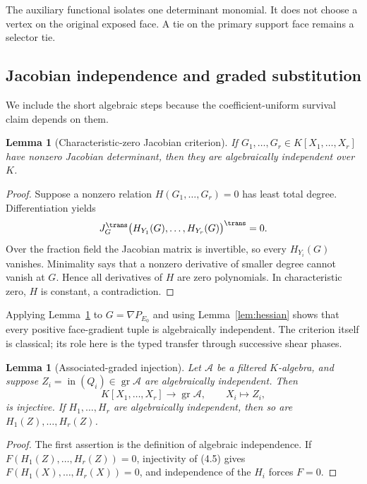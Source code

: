 \documentclass[11pt]{article}
\newtheorem{lemma}[theorem]{Lemma}
\theoremstyle{definition}
\theoremstyle{remark}
\begin{document}
The auxiliary functional isolates one determinant monomial.  It does not
choose a vertex on the original exposed face.  A tie on the primary
support face remains a selector tie.

\subsection{Jacobian independence and graded substitution}

We include the short algebraic steps because the coefficient-uniform
survival claim depends on them.

\begin{lemma}[Characteristic-zero Jacobian criterion]
\label{lem:jacobian}
If \(G_1,\ldots,G_r\in K[X_1,\ldots,X_r]\) have nonzero Jacobian
determinant, then they are algebraically independent over \(K\).
\end{lemma}

\begin{proof}
Suppose a nonzero relation \(H(G_1,\ldots,G_r)=0\) has least total degree.
Differentiation yields
\[
 J_G^{\trans}
 \bigl(H_{Y_1}(G),\ldots,H_{Y_r}(G)\bigr)^{\trans}=0.
\]
Over the fraction field the Jacobian matrix is invertible, so every
\(H_{Y_i}(G)\) vanishes.  Minimality says that a nonzero derivative of
smaller degree cannot vanish at \(G\).  Hence all derivatives of \(H\) are
zero polynomials.  In characteristic zero, \(H\) is constant, a
contradiction.
\end{proof}

Applying Lemma~\ref{lem:jacobian} to
\(G=\nabla P_{E_0}\) and using Lemma~\ref{lem:hessian} shows that every
positive face-gradient tuple is algebraically independent.  The criterion
itself is classical; its role here is the typed transfer through successive
shear phases.

\begin{lemma}[Associated-graded injection]
\label{lem:graded}
Let \(\mathcal A\) be a filtered \(K\)-algebra, and suppose
\(Z_i=\operatorname{in}(Q_i)\in\operatorname{gr}\mathcal A\) are
algebraically independent.  Then
\[
 K[X_1,\ldots,X_r]\longrightarrow\operatorname{gr}\mathcal A,
 \qquad X_i\longmapsto Z_i,
\tag{4.5}
\]
is injective.  If \(H_1,\ldots,H_r\) are algebraically independent, then so
are \(H_1(Z),\ldots,H_r(Z)\).
\end{lemma}

\begin{proof}
The first assertion is the definition of algebraic independence.  If
\(F(H_1(Z),\ldots,H_r(Z))=0\), injectivity of (4.5) gives
\(F(H_1(X),\ldots,H_r(X))=0\), and independence of the \(H_i\) forces
\(F=0\).
\end{proof}
\end{document}

